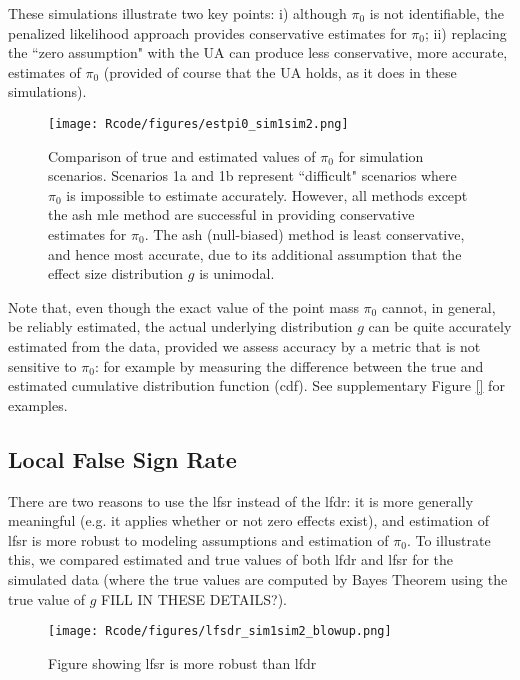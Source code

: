\documentclass[11pt]{article}
\begin{document}
These simulations illustrate two key points: i) although $\pi_0$ is not identifiable, the penalized likelihood approach
provides conservative estimates for $\pi_0$; ii) replacing the ``zero assumption" with the UA can produce
less conservative, more accurate, estimates of $\pi_0$ (provided of course that the UA holds, as it does in these simulations).

\begin{figure}[!ht] \label{fig:pi0}
\begin{center}
\texttt{[image: Rcode/figures/estpi0\_sim1sim2.png]}
\end{center}
\caption{Comparison of true and estimated values of $\pi_0$ for simulation scenarios. Scenarios 1a and 1b represent ``difficult" scenarios where $\pi_0$ is impossible to estimate accurately. However, all methods except the ash mle method are successful in providing conservative estimates for $\pi_0$. The ash (null-biased) method is least conservative, and hence most accurate, due to its additional assumption that the effect size distribution $g$ is unimodal.}
\end{figure}

Note that, even though the exact value of the point mass $\pi_0$ cannot, in general, be reliably estimated, the actual underlying distribution $g$ 
can be quite accurately estimated from the data, provided we assess accuracy by a metric that is not sensitive to $\pi_0$: for example
by measuring the difference between the true and estimated cumulative distribution function (cdf). See supplementary Figure \ref{} for examples.

\subsection*{Local False Sign Rate}

There are two reasons to use the lfsr instead of the lfdr: it is more generally meaningful (e.g. it applies
whether or not zero effects exist),  and estimation of lfsr is more robust to modeling assumptions and estimation of $\pi_0$. 
To illustrate this, we compared estimated and true values of both lfdr and lfsr for the simulated data (where the true
values are computed by Bayes Theorem using the true value of $g$ FILL IN THESE DETAILS?). 



\begin{figure}[!ht]
\begin{center}
\texttt{[image: Rcode/figures/lfsdr\_sim1sim2\_blowup.png]}
\end{center}
\caption{Figure showing lfsr is more robust than lfdr}
\end{figure}
\end{document}
